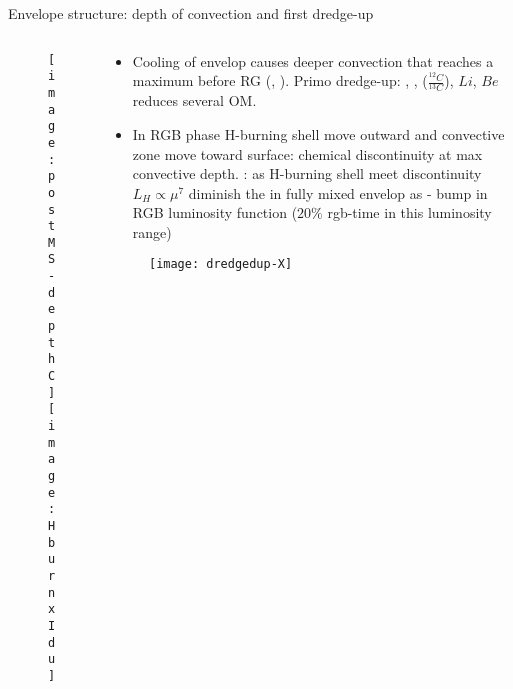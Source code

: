 \begin{frame}{Envelope structure: depth of convection and first dredge-up}
\begin{columns}[T]\begin{column}{0.44\textwidth}
\begin{figure}[!ht] 
\texttt{[image: postMS-depthC]}\label{fig:postMS-depthC}
\texttt{[image: HburnxIdu]}\label{fig:HburnxIdu}
\end{figure}
\end{column}
\begin{column}{0.50\textwidth}
\begin{itemize}
\item Cooling  of envelop causes deeper convection that reaches a maximum before RG (, \xaumenta{\kappa}). Primo dredge-up: , ,  ($\frac{^{12}C}{^{13}C}$), $Li$, $Be$ reduces several OM.
\item In  RGB phase H-burning shell move outward and convective zone move toward surface: chemical discontinuity at max convective depth. : as H-burning shell meet discontinuity $L_H\propto\mu^7$ diminish the in fully mixed envelop  as  - bump in RGB luminosity function ($20\%$ rgb-time in this luminosity range)
\end{itemize}


\begin{figure}[!ht] 
\texttt{[image: dredgedup-X]}\label{fig:dredgedup-X}
\end{figure}
\end{column}\end{columns}
\end{frame}

